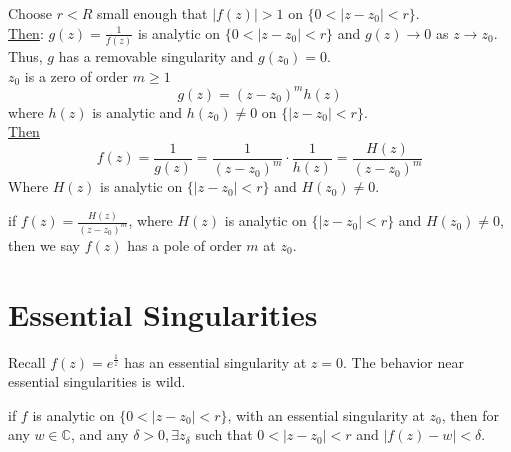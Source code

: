 \begin{lemma}
    [Poles]
    Choose $r < R$ small enough that $|f(z)| > 1$ on $\{0 < |z-z_0| < r \}$. \\
    \underline{Then}: $g(z) = \frac{1}{f(z)}$ is analytic on $\{0 < |z - z_0| < r\}$ and $g(z) \to 0$ as $z \to z_0$. \\
    Thus, $g$ has a removable singularity and $g(z_0) = 0$.\\
    $z_0$ is a zero of order $m \geq 1$
    \begin{equation*}
        g(z) = (z - z_0)^m h(z)
    \end{equation*}
    where $h(z)$ is analytic and $h(z_0) \neq 0$ on $\{|z - z_0| < r\}$. \\
    \underline{Then}
    \begin{equation*}
        f(z) = \frac{1}{g(z)} = \frac{1}{(z - z_0)^m} \cdot \frac{1}{h(z)} = \frac{H(z)}{(z - z_0)^m}
    \end{equation*}
    Where $H(z)$ is analytic on $\{|z-z_0| < r\}$ and $H(z_0) \neq 0$.
\end{lemma}

\begin{definition}
    if $f(z) = \frac{H(z)}{(z - z_0)^m}$, where $H(z)$ is analytic on $\{|z - z_0| < r\}$ and $H(z_0) \neq 0$, then we say $f(z)$ has a pole of order $m$ at $z_0$.
\end{definition}

\section{Essential Singularities}

\begin{remark}
    Recall $f(z) = e^{\frac{1}{z}}$ has an essential singularity at $z = 0$. The behavior near essential singularities is wild.
\end{remark}

\begin{proposition}
    if $f$ is analytic on $\{0 < |z - z_0| < r\}$, with an essential singularity at $z_0$, then for any $w \in \mathbb{C}$, and any $\delta > 0, \exists z_\delta$ such that $0 < |z - z_0|< r$ and $|f(z) - w| < \delta$.
\end{proposition}
